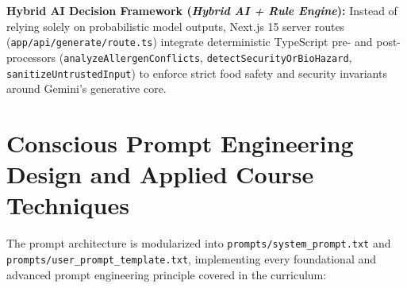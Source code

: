 \documentclass[9pt,a4paper]{article}
\begin{document}
\textbf{Hybrid AI Decision Framework (\emph{Hybrid AI + Rule Engine}):} Instead of relying solely on probabilistic model outputs, Next.js 15 server routes (\texttt{app/api/generate/route.ts}) integrate deterministic TypeScript pre- and post-processors (\texttt{analyzeAllergenConflicts}, \texttt{detectSecurityOrBioHazard}, \texttt{sanitizeUntrustedInput}) to enforce strict food safety and security invariants around Gemini's generative core.

\section{Conscious Prompt Engineering Design and Applied Course Techniques}
The prompt architecture is modularized into \texttt{prompts/system\_prompt.txt} and \texttt{prompts/user\_prompt\_template.txt}, implementing every foundational and advanced prompt engineering principle covered in the curriculum:
\end{document}
